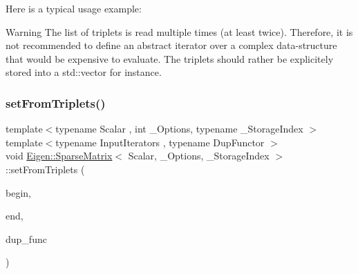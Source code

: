 Here is a typical usage example\+: 
\begin{DoxyCode}{0}
\DoxyCodeLine{\{}
\DoxyCodeLine{  \textcolor{comment}{// ...}}
\DoxyCodeLine{\}}
\DoxyCodeLine{\textcolor{comment}{// m is ready to go!}}
\end{DoxyCode}


\begin{DoxyWarning}{Warning}
The list of triplets is read multiple times (at least twice). Therefore, it is not recommended to define an abstract iterator over a complex data-\/structure that would be expensive to evaluate. The triplets should rather be explicitely stored into a std\+::vector for instance. 
\end{DoxyWarning}
\mbox{\label{class_eigen_1_1_sparse_matrix_ad3eee2d3d2a9843cd095c0207f781e7e}} 
\subsubsection{\texorpdfstring{setFromTriplets()}{setFromTriplets()}\hspace{0.1cm}{\footnotesize\ttfamily [2/2]}}
{\footnotesize\ttfamily template$<$typename Scalar , int \+\_\+\+Options, typename \+\_\+\+Storage\+Index $>$ \\
template$<$typename Input\+Iterators , typename Dup\+Functor $>$ \\
void \mbox{\hyperlink{class_eigen_1_1_sparse_matrix}{Eigen\+::\+Sparse\+Matrix}}$<$ Scalar, \+\_\+\+Options, \+\_\+\+Storage\+Index $>$\+::set\+From\+Triplets (\begin{DoxyParamCaption}\item[{const Input\+Iterators \&}]{begin,  }\item[{const Input\+Iterators \&}]{end,  }\item[{Dup\+Functor}]{dup\+\_\+func }\end{DoxyParamCaption})}

